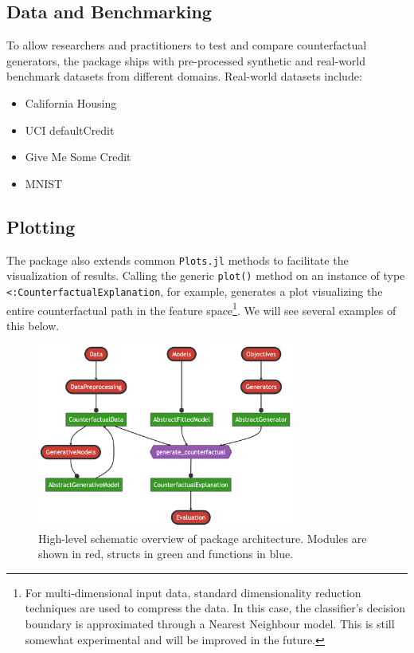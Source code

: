 \documentclass{juliacon}
\begin{document}
\hypertarget{data-and-benchmarking}{%
\subsection{Data and Benchmarking}\label{data-and-benchmarking}}

To allow researchers and practitioners to test and compare
counterfactual generators, the package ships with pre-processed
synthetic and real-world benchmark datasets from different domains.
Real-world datasets include:

\begin{itemize}
\item California Housing \cite{pace1997sparse}
\item UCI defaultCredit \cite{yeh2009comparisons}
\item Give Me Some Credit \cite{kaggle2011give}
\item MNIST \cite{lecun1998mnist}
\end{itemize}

\hypertarget{plotting}{%
\subsection{Plotting}\label{plotting}}

The package also extends common \texttt{Plots.jl} methods to facilitate
the visualization of results. Calling the generic \texttt{plot()} method
on an instance of type \texttt{\textless{}:CounterfactualExplanation},
for example, generates a plot visualizing the entire counterfactual path
in the feature space\footnote{For multi-dimensional input data, standard
  dimensionality reduction techniques are used to compress the data. In
  this case, the classifier's decision boundary is approximated through
  a Nearest Neighbour model. This is still somewhat experimental and
  will be improved in the future.}. We will see several examples of this
below.

\begin{figure}

{\centering \includegraphics[width=3.33333in,height=2.38095in]{www/pkg_architecture.png}

}

\caption{\label{fig-arch}High-level schematic overview of package
architecture. Modules are shown in red, structs in green and functions
in blue.}

\end{figure}
\end{document}
